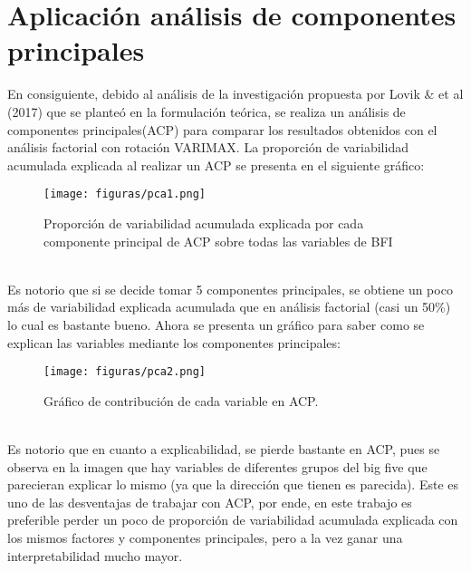 \documentclass{report}
\begin{document}
\newpage
\section{Aplicación análisis de componentes principales}
En consiguiente, debido al análisis de la investigación propuesta por Lovik \& et al (2017) que se planteó en la formulación teórica, se realiza un análisis de componentes principales(ACP) para comparar los resultados obtenidos con el análisis factorial con rotación VARIMAX. La proporción de variabilidad acumulada explicada al realizar un ACP se presenta en el siguiente gráfico:\\
\begin{figure}[htp]
        \centering
    	\texttt{[image: figuras/pca1.png]}
    	\caption{Proporción de variabilidad acumulada explicada por cada componente principal de ACP sobre todas las variables de BFI}
    	\label{fig: Figura1}
\end{figure}\\
Es notorio que si se decide tomar 5 componentes principales, se obtiene un poco más de variabilidad explicada acumulada que en análisis factorial (casi un 50\%) lo cual es bastante bueno. Ahora se presenta un gráfico para saber como se explican las variables mediante los componentes principales:\\
\vspace{5cm}
\begin{figure}[htp]
        \centering
    	\texttt{[image: figuras/pca2.png]}
    	\caption{Gráfico de contribución de cada variable en ACP.}
    	\label{fig: Figura1}
\end{figure}\\
Es notorio que en cuanto a explicabilidad, se pierde bastante en ACP, pues se observa en la imagen que hay variables de diferentes grupos del big five que parecieran explicar lo mismo (ya que la dirección que tienen es parecida). Este es uno de las desventajas de trabajar con ACP, por ende, en este trabajo es preferible perder un poco de proporción de variabilidad acumulada explicada con los mismos factores y componentes principales, pero a la vez ganar una interpretabilidad mucho mayor.\\
\end{document}
